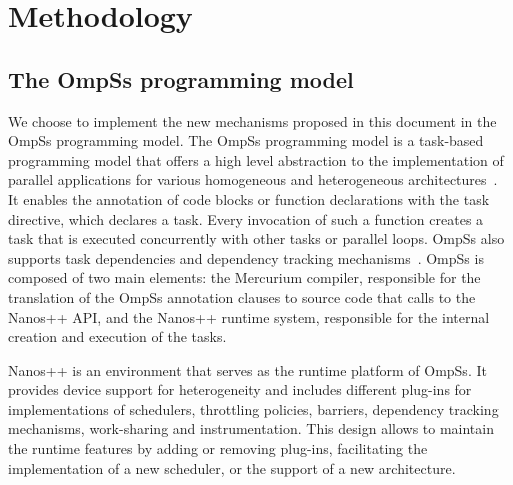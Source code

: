 \chapter{Methodology}

\ifpdf
	\graphicspath{{Chapter5/Figs/Raster/}{Chapter5/Figs/PDF/}{Chapter5/Figs/guided/}{Chapter5/Figs/unguided/}}
\else
    \graphicspath{{Chapter5/Figs/Vector/}{Chapter5/Figs/}}
\fi

\section{The OmpSs programming model}
\label{sec:ompss}
We choose to implement the new mechanisms proposed in this document in the OmpSs programming model.
The OmpSs programming model is a task-based programming model that offers a high level abstraction to the implementation of parallel applications for various homogeneous and heterogeneous architectures~\cite{OmpSs_PPL11,OmpSs}. It enables the annotation of code blocks or function declarations with the task directive, which declares a task. Every invocation of such a function creates a task that is executed concurrently with other tasks or parallel loops. OmpSs also supports task dependencies and dependency tracking mechanisms~\cite{StarSs}. 
OmpSs is composed of two main elements: the Mercurium compiler, responsible for the translation of the OmpSs annotation clauses to source code that calls to the Nanos++ API, and the Nanos++ runtime system, responsible for the internal creation and execution of the tasks. 

Nanos++ is an environment that serves as the runtime platform of OmpSs. It provides device support for heterogeneity and includes different plug-ins for implementations of schedulers, throttling policies, barriers, dependency tracking mechanisms, work-sharing and instrumentation. This design allows to maintain the runtime features by adding or removing plug-ins, facilitating the implementation of a new scheduler, or the support of a new architecture.


